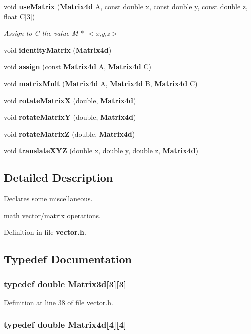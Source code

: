 \begin{DoxyCompactItemize}
void {\bf use\+Matrix} ({\bf Matrix4d} A, const double x, const double y, const double z, float C[3])
\begin{DoxyCompactList}\small\item\em Assign to C the value M $\ast$ $<$x,y,z$>$ \end{DoxyCompactList}\item 
void {\bf identity\+Matrix} ({\bf Matrix4d})
\item 
void {\bf assign} (const {\bf Matrix4d} A, {\bf Matrix4d} C)
\item 
void {\bf matrix\+Mult} ({\bf Matrix4d} A, {\bf Matrix4d} B, {\bf Matrix4d} C)
\item 
void {\bf rotate\+Matrix\+X} (double, {\bf Matrix4d})
\item 
void {\bf rotate\+Matrix\+Y} (double, {\bf Matrix4d})
\item 
void {\bf rotate\+Matrix\+Z} (double, {\bf Matrix4d})
\item 
void {\bf translate\+X\+Y\+Z} (double x, double y, double z, {\bf Matrix4d})
\end{DoxyCompactItemize}


\subsection{Detailed Description}
Declares some miscellaneous. 

math vector/matrix operations. 

Definition in file {\bf vector.\+h}.



\subsection{Typedef Documentation}
\subsubsection[{Matrix3d}]{\setlength{\rightskip}{0pt plus 5cm}typedef double Matrix3d[3][3]}\label{vector_8h_afce00a7cad1c8490e0ab1ecdcf079e46}


Definition at line 38 of file vector.\+h.

\subsubsection[{Matrix4d}]{\setlength{\rightskip}{0pt plus 5cm}typedef double Matrix4d[4][4]}\label{vector_8h_abcd83e68e1fa313de571ac1d30cf2488}


